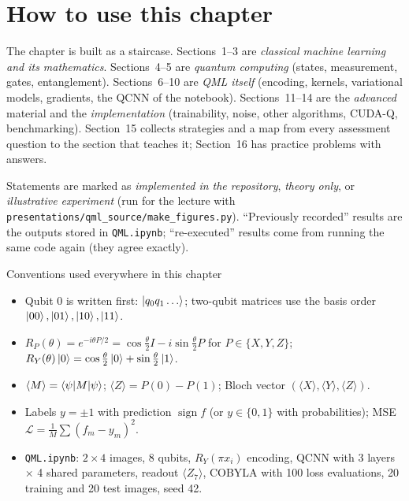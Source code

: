 \documentclass[11pt,a4paper,openany]{book}
\begin{document}
\section*{How to use this chapter}
The chapter is built as a staircase. Sections~1--3 are \emph{classical machine learning and its mathematics}. Sections~4--5
are \emph{quantum computing} (states, measurement, gates, entanglement). Sections~6--10 are \emph{QML itself} (encoding,
kernels, variational models, gradients, the QCNN of the notebook). Sections~11--14 are the \emph{advanced} material and the
\emph{implementation} (trainability, noise, other algorithms, CUDA-Q, benchmarking). Section~15 collects strategies and a map
from every assessment question to the section that teaches it; Section~16 has practice problems with answers.

Statements are marked as \emph{implemented in the repository}, \emph{theory only}, or \emph{illustrative experiment} (run for the
lecture with \texttt{presentations/qml\_source/make\_figures.py}). ``Previously recorded'' results are the outputs stored in
\texttt{QML.ipynb}; ``re-executed'' results come from running the same code again (they agree exactly).

\begin{defn}{Conventions used everywhere in this chapter}
\begin{itemize}[leftmargin=1.2em, itemsep=1pt]
\item Qubit 0 is written first: $\ket{q_0q_1\dots}$; two-qubit matrices use the basis order $\ket{00}, \ket{01}, \ket{10}, \ket{11}$.
\item $R_P(\theta) = e^{-i\theta P/2} = \cos\frac\theta2I - i\sin\frac\theta2P$ for $P \in \{X, Y, Z\}$; $R_Y(\theta)\ket0 = \cos\frac\theta2\ket0 + \sin\frac\theta2\ket1$.
\item $\langle M\rangle = \braket{\psi|M|\psi}$; $\langle Z\rangle = P(0) - P(1)$; Bloch vector $(\langle X\rangle, \langle Y\rangle, \langle Z\rangle)$.
\item Labels $y = \pm1$ with prediction $\operatorname{sign}f$ (or $y \in \{0, 1\}$ with probabilities); MSE $\mathcal L = \frac1M\sum(f_m - y_m)^2$.
\item \texttt{QML.ipynb}: $2\times4$ images, 8 qubits, $R_Y(\pi x_i)$ encoding, QCNN with 3 layers $\times$ 4 shared parameters,
      readout $\langle Z_7\rangle$, COBYLA with 100 loss evaluations, 20 training and 20 test images, seed 42.
\end{itemize}
\end{defn}
\end{document}
